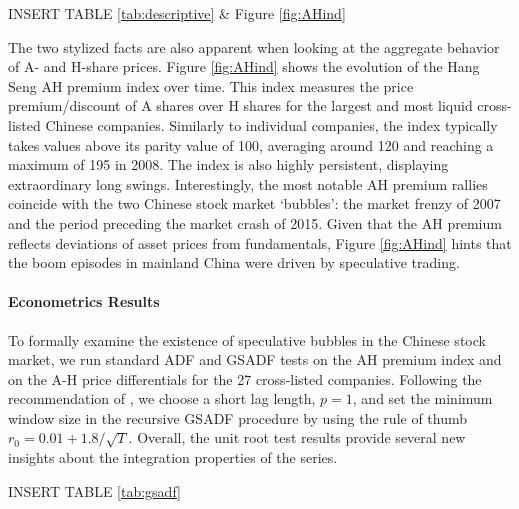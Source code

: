 \documentclass[11pt]{article}
\begin{document}
\bigskip
\begin{center}
INSERT TABLE \ref{tab:descriptive} \& Figure \ref{fig:AHind}
\end{center}
\bigskip


The two stylized facts are also apparent when looking at the aggregate behavior of A- and H-share prices. Figure \ref{fig:AHind} shows the evolution of the Hang Seng AH premium index over time. This index measures the price premium/discount of A shares over H shares for the largest and most liquid cross-listed Chinese companies. Similarly to individual companies, the index typically takes values above its parity value of 100, averaging around 120 and reaching a maximum of 195 in 2008. The index is also highly persistent, displaying extraordinary long swings. Interestingly, the most notable AH premium rallies coincide with the two Chinese stock market `bubbles': the market frenzy of 2007 and the period preceding the market crash of 2015. Given that the AH premium reflects deviations of asset prices from fundamentals, Figure \ref{fig:AHind} hints that the boom episodes in mainland China were driven by speculative trading.


\paragraph{Econometrics Results} To formally examine the existence of speculative bubbles in the Chinese stock market, we run standard ADF and GSADF tests on the AH premium index and on the A-H price differentials for the 27 cross-listed companies. Following the recommendation of \citet{PhillipsSY2015a,PhillipsSY2015b}, we choose a short lag length, $p=1$, and set the minimum window size in the recursive GSADF procedure by using the rule of thumb $r_0=0.01+1.8/\sqrt{T}$. Overall, the unit root test results provide several new insights about the integration properties of the series. 

\bigskip
\begin{center}
INSERT TABLE \ref{tab:gsadf}
\end{center}
\bigskip
\end{document}
